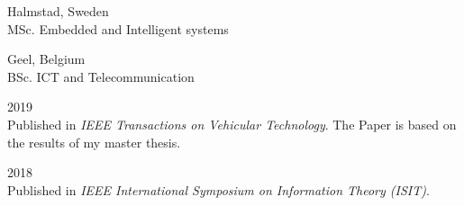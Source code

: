 \documentclass[a4paper,12pt,final]{memoir}
\begin{document}
 \hfill Halmstad, Sweden \\
MSc. Embedded and Intelligent systems
\SmallSep

 \hfill Geel, Belgium \\
BSc. ICT and Telecommunication
\Sep

 \hfill 2019 \\
Published in \emph{IEEE Transactions on Vehicular Technology}. The Paper is based on the results of my master thesis.
\SmallSep

 \hfill 2018 \\
Published in \emph{IEEE International Symposium on Information Theory (ISIT)}.
\Sep

\end{document}
